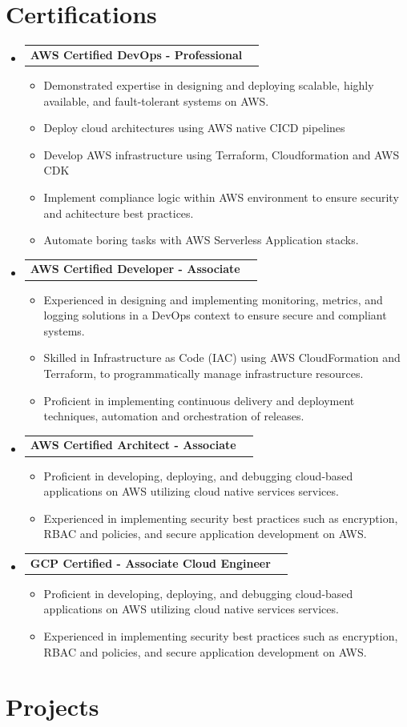 \documentclass[letterpaper,11pt]{article}
\makeatletter
\newcommand{\resumeItem}[1]{
  \item\small{
    {#1 \vspace{-2pt}}
  }
}
\newcommand{\resumeProjectHeading}[2]{
    \item
    \begin{tabular*}{0.97\textwidth}{l@{\extracolsep{\fill}}r}
      \small#1 & #2 \\
    \end{tabular*}\vspace{-7pt}
}
\newcommand{\resumeSubHeadingListStart}{\begin{itemize}[leftmargin=0.15in, label={}]}
\newcommand{\resumeSubHeadingListEnd}{\end{itemize}}
\newcommand{\resumeItemListStart}{\begin{itemize}}
\newcommand{\resumeItemListEnd}{\end{itemize}\vspace{-5pt}}
\makeatother
\begin{document}
\section{Certifications}

\resumeSubHeadingListStart
  \resumeProjectHeading
  {\textbf{AWS Certified DevOps - Professional}}{}
  \resumeItemListStart
    \resumeItem{Demonstrated expertise in designing and deploying scalable, highly available, and fault-tolerant systems on AWS.}
    \resumeItem{Deploy cloud architectures using AWS native CICD pipelines}
    \resumeItem{Develop AWS infrastructure using Terraform, Cloudformation and AWS CDK}
    \resumeItem{Implement compliance logic within AWS environment to ensure security and achitecture best practices.}
    \resumeItem{Automate boring tasks with AWS Serverless Application stacks.}
  \resumeItemListEnd

  \resumeProjectHeading{\textbf{AWS Certified Developer - Associate}}{}
  \resumeItemListStart
    \resumeItem{Experienced in designing and implementing monitoring, metrics, and logging solutions in a DevOps context to ensure secure and compliant systems.}

    \resumeItem{Skilled in Infrastructure as Code (IAC) using AWS CloudFormation and Terraform, to programmatically manage infrastructure resources.}
    \resumeItem{Proficient in implementing continuous delivery and deployment techniques, automation and orchestration of releases.}
  \resumeItemListEnd

  \resumeProjectHeading
  {\textbf{AWS Certified Architect - Associate}}{}
  \resumeItemListStart
    \resumeItem{Proficient in developing, deploying, and debugging cloud-based applications on AWS utilizing cloud native services services.}
    \resumeItem{Experienced in implementing security best practices such as encryption, RBAC and policies, and secure application development on AWS.}
  \resumeItemListEnd
  
  \resumeProjectHeading
  {\textbf{GCP Certified - Associate Cloud Engineer}}{}
  \resumeItemListStart
    \resumeItem{Proficient in developing, deploying, and debugging cloud-based applications on AWS utilizing cloud native services services.}
    \resumeItem{Experienced in implementing security best practices such as encryption, RBAC and policies, and secure application development on AWS.}
  \resumeItemListEnd


\resumeSubHeadingListEnd

\section{Projects}
\end{document}
